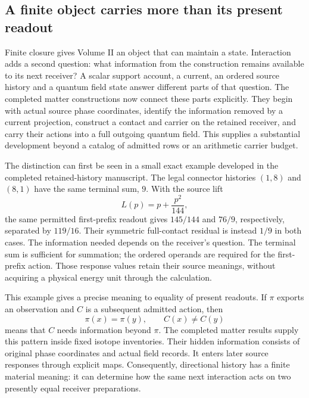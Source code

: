 
\subsection{A finite object carries more than its present readout}

Finite closure gives Volume II an object that can maintain a state. Interaction adds a second question: what information from the construction remains available to its next receiver? A scalar support account, a current, an ordered source history and a quantum field state answer different parts of that question. The completed matter constructions now connect these parts explicitly. They begin with actual source phase coordinates, identify the information removed by a current projection, construct a contact and carrier on the retained receiver, and carry their actions into a full outgoing quantum field. This supplies a substantial development beyond a catalog of admitted rows or an arithmetic carrier budget.

The distinction can first be seen in a small exact example developed in the completed retained-history manuscript. The legal connector histories $(1,8)$ and $(8,1)$ have the same terminal sum, $9$. With the source lift
\begin{equation}
 L(p)=p+\frac{p^2}{144},
\end{equation}
the same permitted first-prefix readout gives $145/144$ and $76/9$, respectively, separated by $119/16$. Their symmetric full-contact residual is instead $1/9$ in both cases. The information needed depends on the receiver's question. The terminal sum is sufficient for summation; the ordered operands are required for the first-prefix action. Those response values retain their source meanings, without acquiring a physical energy unit through the calculation.

This example gives a precise meaning to equality of present readouts. If $\pi$ exports an observation and $C$ is a subsequent admitted action, then
\begin{equation}
 \pi(x)=\pi(y),\qquad C(x)\ne C(y)
\end{equation}
means that $C$ needs information beyond $\pi$. The completed matter results supply this pattern inside fixed isotope inventories. Their hidden information consists of original phase coordinates and actual field records. It enters later source responses through explicit maps. Consequently, directional history has a finite material meaning: it can determine how the same next interaction acts on two presently equal receiver preparations.

